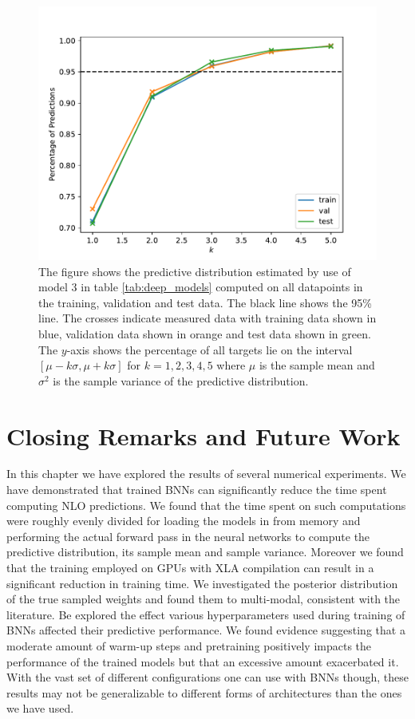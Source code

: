 \begin{figure}[h!]
    \centering
    \includegraphics[scale=0.7]{figures/confidence_estimation/good_vs_bad_cases_confidence.pdf}
    \caption{
        The figure shows the predictive distribution estimated by use of model 3 in table \ref{tab:deep_models}
        computed on all datapoints in the training, validation and test data. The black line shows the 95\% line. The crosses indicate measured data with training data shown in blue, validation data shown in orange and test data shown in green. The $y$-axis shows the percentage of all targets lie on the interval $[\mu - k\sigma, \mu + k\sigma]$ for $k=1,2,3,4,5$ where $\mu$ is the sample mean and $\sigma^2$ is the sample variance of the predictive distribution.
    }
    \label{fig:confidence}
\end{figure}


\section{Closing Remarks and Future Work}
In this chapter we have explored the results of several numerical experiments. We have demonstrated that trained BNNs can significantly reduce the time spent computing NLO predictions. We found that the time spent on such computations were roughly evenly divided for loading the models in from memory and performing the actual forward pass in the neural networks to compute the predictive distribution, its sample mean and sample variance. Moreover we found that the training employed on GPUs with XLA compilation can result in a significant reduction in training time.
We investigated the posterior distribution of the true sampled weights and found them to multi-modal, consistent with the literature. Be explored the effect various hyperparameters used during training of BNNs affected their predictive performance. We found evidence suggesting that a moderate amount of warm-up steps and pretraining positively impacts the performance of the trained models but that an excessive amount exacerbated it. With the vast set of different configurations one can use with BNNs though, these results may not be generalizable to different forms of architectures than the ones we have used.






